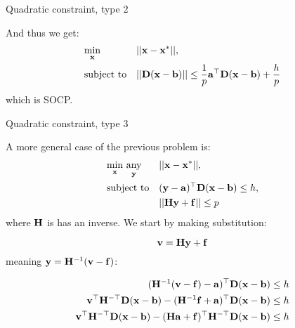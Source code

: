 \documentclass{beamer}
\begin{document}
\begin{frame}{Quadratic constraint, type 2}
\begin{flushleft}

And thus we get:
%
\begin{equation}
\begin{aligned}
& \underset{\mathbf{x}}{\text{min}}
& & ||\mathbf{x} - \mathbf{x}^*||, \\
& \text{subject to}
& & || \mathbf{D} (\mathbf{x} - \mathbf{b}) ||  \leq \frac{1}{p}\mathbf{a}^\top \mathbf{D} (\mathbf{x} - \mathbf{b}) + \frac{h}{p}
\end{aligned}
\end{equation}
%
which is SOCP. 
 
\end{flushleft}
\end{frame}






\begin{frame}{Quadratic constraint, type 3}
\begin{flushleft}

A more general case of the previous problem is:
%
\begin{equation}
\begin{aligned}
& \underset{\mathbf{x}}{\text{min}} \ \underset{\mathbf{y}}{\text{any}}
& & ||\mathbf{x} - \mathbf{x}^*||, \\
& \text{subject to}
& & (\mathbf{y} - \mathbf{a})^\top \mathbf{D} (\mathbf{x} - \mathbf{b}) \leq h, \\
& & & ||\mathbf{H}\mathbf{y} + \mathbf{f}|| \leq p
\end{aligned}
\end{equation}
%
where $\mathbf{H}$ is has an inverse. We start by making substitution:

\begin{equation}
    \mathbf{v} = \mathbf{H}\mathbf{y} + \mathbf{f}
\end{equation}
%
meaning $\mathbf{y} = \mathbf{H}^{-1}(\mathbf{v} -\mathbf{f})$:

\begin{align}
    (\mathbf{H}^{-1}(\mathbf{v} -\mathbf{f}) - \mathbf{a})^\top \mathbf{D} (\mathbf{x} - \mathbf{b}) \leq h \\
    \mathbf{v}^\top \mathbf{H}^{-\top} \mathbf{D} (\mathbf{x} - \mathbf{b}) - (\mathbf{H}^{-1}\mathbf{f} + \mathbf{a})^\top \mathbf{D} (\mathbf{x} - \mathbf{b}) \leq h\\
    \mathbf{v}^\top \mathbf{H}^{-\top} \mathbf{D} (\mathbf{x} - \mathbf{b}) - (\mathbf{H}\mathbf{a} + \mathbf{f})^\top \mathbf{H}^{-\top}\mathbf{D} (\mathbf{x} - \mathbf{b}) \leq h
\end{align}

 
\end{flushleft}
\end{frame}
\end{document}
